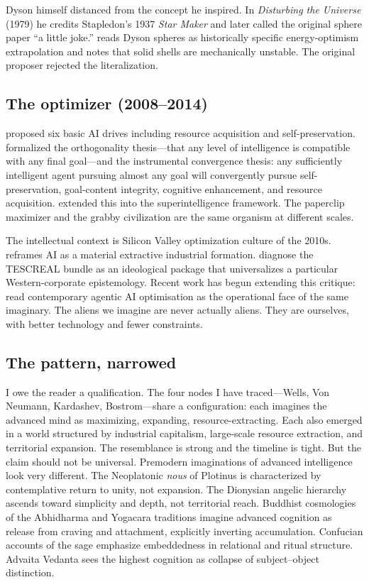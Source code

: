 \documentclass[11pt,twocolumn]{article}
\begin{document}
Dyson himself distanced from the concept he inspired. In \emph{Disturbing
the Universe} (1979) he credits Stapledon's 1937 \emph{Star Maker} and
later called the original sphere paper ``a little joke.'' \citet{Wright2020}
reads Dyson spheres as historically specific energy-optimism extrapolation
and notes that solid shells are mechanically unstable. The original
proposer rejected the literalization.

\subsection{The optimizer (2008--2014)}

\citet{Omohundro2008} proposed six basic AI drives including resource
acquisition and self-preservation. \citet{Bostrom2012} formalized the
orthogonality thesis—that any level of intelligence is compatible with any
final goal—and the instrumental convergence thesis: any sufficiently
intelligent agent pursuing almost any goal will convergently pursue
self-preservation, goal-content integrity, cognitive enhancement, and
resource acquisition. \citet{Bostrom2014} extended this into the
superintelligence framework. The paperclip maximizer and the grabby
civilization are the same organism at different scales.

The intellectual context is Silicon Valley optimization culture of the
2010s. \citet{Crawford2021} reframes AI as a material extractive industrial
formation. \citet{GebruTorres2024} diagnose the TESCREAL bundle as an
ideological package that universalizes a particular Western-corporate
epistemology. Recent work has begun extending this critique:
\citet{FloridiAAIO} read contemporary agentic AI optimisation as the
operational face of the same imaginary. The aliens we imagine are never
actually aliens. They are ourselves, with better technology and fewer
constraints.

\subsection{The pattern, narrowed}

I owe the reader a qualification. The four nodes I have traced—Wells, Von
Neumann, Kardashev, Bostrom—share a configuration: each imagines the
advanced mind as maximizing, expanding, resource-extracting. Each also
emerged in a world structured by industrial capitalism, large-scale
resource extraction, and territorial expansion. The resemblance is strong
and the timeline is tight. But the claim should not be universal. Premodern
imaginations of advanced intelligence look very different. The Neoplatonic
\emph{nous} of Plotinus is characterized by contemplative return to unity,
not expansion. The Dionysian angelic hierarchy ascends toward simplicity
and depth, not territorial reach. Buddhist cosmologies of the Abhidharma
and Yogacara traditions imagine advanced cognition as release from craving
and attachment, explicitly inverting accumulation. Confucian accounts of
the sage emphasize embeddedness in relational and ritual structure.
Advaita Vedanta sees the highest cognition as collapse of subject--object
distinction.
\end{document}
